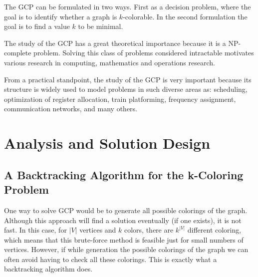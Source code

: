 \documentclass{article}
\begin{document}
The GCP can be formulated in two ways. First as a decision problem, where the goal is to identify whether a graph is $k$-colorable. In the second formulation the goal is to find a value $k$ to be minimal.


The study of the GCP has a great theoretical importance because it is a NP-complete problem\cite{MR519066}. Solving this class of problems considered intractable motivates various research in computing, mathematics and operations research.

From a practical standpoint, the study of the GCP is very important because its structure is widely used to model problems in such diverse areas as: scheduling\cite{Lotfi198627}, optimization of register allocation\cite{Chow}, train platforming\cite{Caprara2007129}, frequency assignment\cite{1623376}, communication networks\cite{120165}, and many others.




\section{Analysis and Solution Design}

\subsection{A Backtracking Algorithm for the k-Coloring Problem}

One way to solve GCP would be to generate all possible colorings of the graph. Although this approach will find a solution eventually (if one exists), it is not fast. In this case, for $|V|$ vertices and $k$ colors, there are $k^{|V|}$ different coloring, which means that this brute-force method is feasible just for small numbers of vertices. However, if while generation the possible colorings of the graph we can often avoid  having to check all these colorings. This is exactly what a backtracking algorithm does. 
\end{document}
